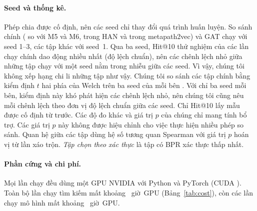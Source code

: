 \paragraph{Seed và thống kê.} Phép chia được cố định, nên các seed chỉ thay đổi quá trình huấn
luyện. So sánh chính ( so với M5 và M6, trong HAN và trong metapath2vec) và GAT chạy với
seed 1--3, các tập khác với seed~1. Qua ba seed, Hit@10 thử nghiệm của các lần chạy chính dao động
nhiều nhất  (độ lệch chuẩn), nên các chênh lệch nhỏ giữa những tập chạy với
một seed nằm trong nhiễu giữa các seed. Vì vậy, chúng tôi không xếp hạng chi li những tập như vậy. Chúng
tôi so sánh các tập chính bằng kiểm định $t$ hai phía của Welch trên ba seed của mỗi bên
\citep{welch1947generalization}. Với chỉ ba seed mỗi bên, kiểm định này khó phát hiện các chênh lệch nhỏ, nên
chúng tôi cũng nêu mỗi chênh lệch theo đơn vị độ lệch chuẩn giữa các seed. Chỉ Hit@10 lấy mẫu được cố định từ
trước. Các độ đo khác và giá trị $p$ của chúng chỉ mang tính bổ trợ. Các giá trị $p$ này không được hiệu
chỉnh cho việc thực hiện nhiều phép so sánh. Quan hệ giữa các tập dùng hệ số tương quan Spearman với giá
trị $p$ hoán vị từ  lần xáo trộn. \emph{Tập chọn theo xác thực} là tập có BPR
xác thực thấp nhất.

\paragraph{Phần cứng và chi phí.} Mọi lần chạy đều dùng một GPU NVIDIA  với Python
 và PyTorch  (CUDA ). Toàn bộ 
lần chạy tìm kiếm mất khoảng ~giờ~GPU (Bảng~\ref{tab:cost}), còn các lần chạy mô
hình mất khoảng ~giờ~GPU.
